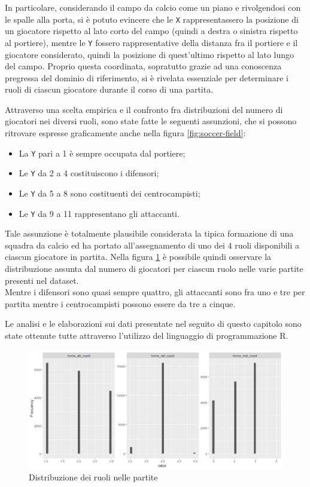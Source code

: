 \documentclass[hidelinks, 12pt]{article}
\begin{document}
In particolare, considerando il campo da calcio come un piano e rivolgendosi con le spalle alla porta, si è potuto evincere che le \texttt{X} rappresentassero la posizione di un giocatore rispetto al lato corto del campo (quindi a destra o sinistra rispetto al portiere), mentre le \texttt{Y} fossero rappresentative della distanza fra il portiere e il giocatore considerato, quindi la posizione di quest'ultimo rispetto al lato lungo del campo. Proprio questa coordinata, sopratutto grazie ad una conoscenza pregressa del dominio di riferimento, si è rivelata essenziale per determinare i ruoli di ciascun giocatore durante il corso di una partita.

Attraverso una scelta empirica e il confronto fra distribuzioni del numero di giocatori nei diversi ruoli, sono state fatte le seguenti assunzioni, che si possono ritrovare espresse graficamente anche nella figura \ref{fig:soccer-field}:

\begin{itemize}
	\item La \texttt{Y} pari a 1 è sempre occupata dal portiere;
	\item Le \texttt{Y} da 2 a 4 costituiscono i difensori;
	\item Le \texttt{Y} da 5 a 8 sono costituenti dei centrocampisti;
	\item Le \texttt{Y} da 9 a 11 rappresentano gli attaccanti.
\end{itemize}

Tale assunzione è totalmente plausibile considerata la tipica formazione di una squadra da calcio ed ha portato all'assegnamento di uno dei 4 ruoli disponibili a ciascun giocatore in partita. Nella figura \ref{fig:dataset-roles-distr} è possibile quindi osservare la distribuzione assunta dal numero di giocatori per ciascun ruolo nelle varie partite presenti nel dataset. \\
Mentre i difensori sono quasi sempre quattro, gli attaccanti sono fra uno e tre per partita mentre i centrocampisti possono essere da tre a cinque.

\vspace{2ex}

Le analisi e le elaborazioni sui dati presentate nel seguito di questo capitolo sono state ottenute tutte attraverso l'utilizzo del linguaggio di programmazione R.

\begin{figure}[H]
	\label{fig:dataset-roles-distr}
	\centering
	\includegraphics[scale=0.6]{images/04_01_roles_distribution.png}
	\caption[Distribuzione dei ruoli nelle partite]{Distribuzione dei ruoli nelle partite}
\end{figure}
\end{document}
